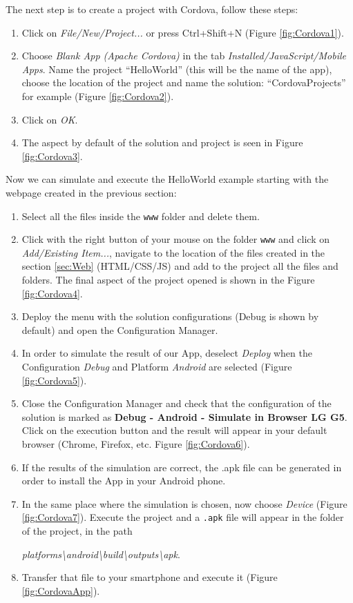 \FloatBarrier
The next step is to create a project with Cordova, follow these steps:

\begin{enumerate}
    \item Click on \textit{File/New/Project...} or press Ctrl+Shift+N (Figure \ref{fig:Cordova1}).
    \item Choose \textit{Blank App (Apache Cordova)} in the tab \textit{Installed/JavaScript/Mobile Apps}. Name the project ``HelloWorld'' (this will be the name of the app), choose the location of the project and name the solution: ``CordovaProjects'' for example (Figure \ref{fig:Cordova2}).
    \item Click on \textit{OK}.
    \item The aspect by default of the solution and project is seen in Figure \ref{fig:Cordova3}.
\end{enumerate}


\newpage
Now we can simulate and execute the HelloWorld example starting with the webpage created in the previous section:

\begin{enumerate}
    \item Select all the files inside the \texttt{www} folder and delete them.
    \item Click with the right button of your mouse on the folder \texttt{www} and click on \textit{Add/Existing Item...}, navigate to the location of the files created in the section \ref{sec:Web} (HTML/CSS/JS) and add to the project all the files and folders. The final aspect of the project opened is shown in the Figure \ref{fig:Cordova4}.
    \item Deploy the menu with the solution configurations (Debug is shown by default) and open the Configuration Manager.
    \item In order to simulate the result of our App, deselect \textit{Deploy} when the Configuration \textit{Debug} and Platform \textit{Android} are selected (Figure \ref{fig:Cordova5}).
    \item Close the Configuration Manager and check that the configuration of the solution is marked as \textbf{Debug - Android - Simulate in Browser LG G5}. Click on the execution button and the result will appear in your default browser (Chrome, Firefox, etc. Figure \ref{fig:Cordova6}).
    \item If the results of the simulation are correct, the .apk file can be generated in order to install the App in your Android phone.
    \item In the same place where the simulation is chosen, now choose \textit{Device} (Figure \ref{fig:Cordova7}). Execute the project and a \texttt{.apk} file will appear in the folder of the project, in the path 
    
    \textit{platforms\textbackslash android\textbackslash build\textbackslash outputs\textbackslash apk}.
    
    \item Transfer that file to your smartphone and execute it (Figure \ref{fig:CordovaApp}).
\end{enumerate}

